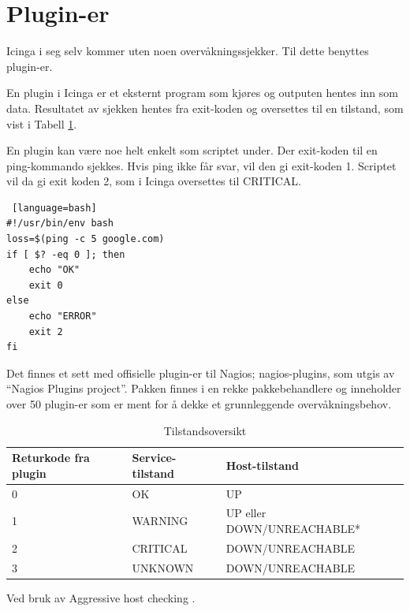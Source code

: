 \section{Plugin-er}
Icinga i seg selv kommer uten noen overvåkningssjekker. Til dette benyttes plugin-er.

En plugin i Icinga er et eksternt program som kjøres og outputen hentes inn som data. Resultatet av sjekken hentes fra exit-koden \cite{wiki:returncode} og oversettes til en tilstand, som vist i Tabell \ref{state}.

En plugin kan være noe helt enkelt som scriptet under. Der exit-koden til en ping-kommando sjekkes. Hvis ping ikke får svar, vil den gi exit-koden 1. Scriptet vil da gi exit koden 2, som i Icinga oversettes til CRITICAL.
\begin{lstlisting} [language=bash]
#!/usr/bin/env bash
loss=$(ping -c 5 google.com)
if [ $? -eq 0 ]; then
    echo "OK"
    exit 0
else
    echo "ERROR"
    exit 2
fi
\end{lstlisting}

Det finnes et sett med offisielle plugin-er til Nagios; nagios-plugins, som utgis av ``Nagios Plugins project''. Pakken finnes i en rekke pakkebehandlere og inneholder over 50 plugin-er som er ment for å dekke et grunnleggende overvåkningsbehov.\cite{nagiosplugins}

\begin{table}[H]
	\begin{center}
	\begin{threeparttable}
	\begin{tabular}{| l | l | l |} \hline
	\textbf{Returkode fra plugin} & \textbf{Service-tilstand} & \textbf{Host-tilstand} \\ \hline
	0 & OK & UP \\ \hline
	1 & WARNING & UP eller DOWN/UNREACHABLE* \\ \hline
	2 & CRITICAL & DOWN/UNREACHABLE \\ \hline
	3 & UNKNOWN & DOWN/UNREACHABLE \\ \hline
	\end{tabular}
	\begin{tablenotes}
	\small
	\item *Ved bruk av Aggressive host checking \cite{icingapluginapi}.
	\end{tablenotes}
	\caption{Tilstandsoversikt}
	\label{state}
	\end{threeparttable}
	\end{center}
\end{table}

